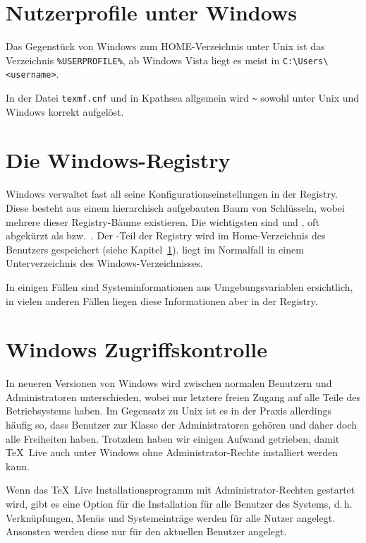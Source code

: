 \documentclass[12pt,ngerman,a4paper,fullparskip]{report}
\newcommand{\TL}{\TeX\ Live\xspace}
\newcommand{\filename}[1]{\texttt{#1}}
\newcommand{\KPS}{Kpathsea\xspace}
\begin{document}
\section{Nutzerprofile unter Windows}
\label{sec:winhome}

Das Gegenstück von Windows zum HOME-Verzeichnis unter Unix ist das
Verzeichnis \verb|%USERPROFILE%|, ab Windows Vista liegt es meist in \verb|C:\Users\<username>|.

In der Datei  \filename{texmf.cnf} und in \KPS{} allgemein wird \verb|~| 
sowohl unter Unix und Windows korrekt aufgelöst.

\section{Die Windows-Registry}
\label{sec:registry}

Windows verwaltet fast all seine Konfigurationseinstellungen in der Registry. Diese besteht aus einem hierarchisch aufgebauten Baum von Schlüsseln, wobei mehrere dieser Registry-Bäume existieren. Die wichtigsten sind  und , oft abgekürzt als  bzw.\ . Der -Teil der Registry wird im Home-Verzeichnis des Benutzers gespeichert (siehe Kapitel~\ref{sec:winhome}).  liegt im
Normalfall in einem Unterverzeichnis des Windows-Verzeichnisses.

In einigen Fällen sind Systeminformationen aus Umgebungsvariablen ersichtlich, in vielen anderen Fällen liegen diese Informationen aber in der Registry.

\section{Windows Zugriffskontrolle}
\label{sec:winpermissions}

In neueren Versionen von Windows wird zwischen normalen Benutzern und Administratoren unterschieden, wobei nur letztere freien Zugang auf alle Teile des Betriebsystems haben. 
Im Gegensatz zu Unix ist es in der Praxis allerdings häufig so, dass Benutzer zur Klasse der Administratoren
gehören und daher doch alle Freiheiten haben. 
Trotzdem haben wir einigen Aufwand getrieben, damit \TL auch unter Windows ohne Administrator-Rechte
installiert werden kann.

Wenn das \TL Installationsprogramm mit Administrator-Rechten gestartet wird, gibt es eine Option für die Installation für alle Benutzer des Systems, d.\,h. Verknüpfungen, Menüs und Systemeinträge werden für alle Nutzer angelegt. 
Ansonsten werden diese nur für den aktuellen Benutzer angelegt.
\end{document}
